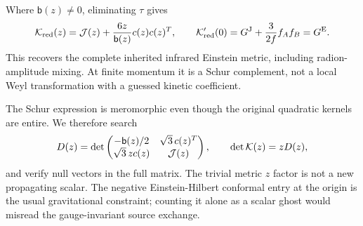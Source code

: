 Where $\mathsf b(z)\ne0$, eliminating $\tau$ gives
\begin{equation}
 \mathcal K_{\rm red}(z)=\mathcal J(z)+\frac{6z}{\mathsf b(z)}c(z)c(z)^T,\qquad
 \mathcal K_{\rm red}'(0)=G^{\mathrm J}+\frac{3}{2f}f_Af_B=G^{\mathrm E}.\label{eq:Schur}
\end{equation}
This recovers the complete inherited infrared Einstein metric, including radion-amplitude mixing. At finite momentum it is a Schur complement, not a local Weyl transformation with a guessed kinetic coefficient.

The Schur expression is meromorphic even though the original quadratic kernels are entire. We therefore search
\begin{equation}
 D(z)=\det\begin{pmatrix}-\mathsf b(z)/2&\sqrt3\,c(z)^T\\
 \sqrt3\,z c(z)&\mathcal J(z)\end{pmatrix},\qquad \det\mathcal K(z)=zD(z),\label{eq:entireD}
\end{equation}
and verify null vectors in the full matrix. The trivial metric $z$ factor is not a new propagating scalar. The negative Einstein-Hilbert conformal entry at the origin is the usual gravitational constraint; counting it alone as a scalar ghost would misread the gauge-invariant source exchange.
